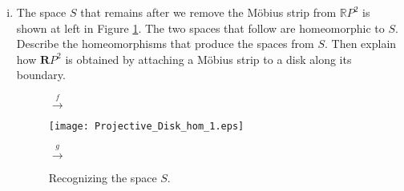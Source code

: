 \begin{enumerate}[i.]
	\item The space $S$ that remains after we remove the M{\"o}bius strip from $\mathbb{R}P^2$ is shown at left in Figure \ref{F:projective_3}. The two spaces that follow are homeomorphic to $S$. Describe the homeomorphisms that produce the spaces from $S$. Then explain how $\mathbf{R}P^2$ is obtained by attaching a M{\"o}bius strip to a disk along its boundary. 
\begin{center}
\begin{figure}
\begin{center}
 \hspace{0.1in} \begin{minipage}[c]{0.25in}{\vspace{-1.25in} $\xrightarrow{f}$}\end{minipage} \hspace{0.1in} \resizebox{!}{1.25in} {\texttt{[image: Projective\_Disk\_hom\_1.eps]}} \hspace{0.1in} \begin{minipage}[c]{0.25in}{\vspace{-1.25in} $\xrightarrow{g}$}\end{minipage} \hspace{0.1in} 
\caption{Recognizing the space $S$.} 
\label{F:projective_3}
\end{center}
\end{figure}
\end{center}
	\end{enumerate}

\ea

